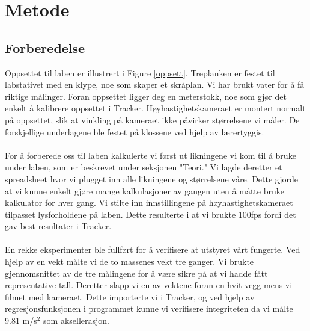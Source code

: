 \documentclass[10pt,a4paper]{report}
\begin{document}
\section*{Metode}
\subsection*{Forberedelse}
Oppsettet til laben er illustrert i Figure \ref{oppsett}. Treplanken er festet til labstativet med en klype, noe som skaper et skråplan. Vi har brukt vater for å få riktige målinger. Foran oppsettet ligger deg en meterstokk, noe som gjør det enkelt å kalibrere oppsettet i Tracker. Høyhastighetskameraet er montert normalt på oppsettet, slik at vinkling på kameraet ikke påvirker størrelsene vi måler. De forskjellige underlagene ble festet på klossene ved hjelp av lærertyggis.\\
\\For å forberede oss til laben kalkulerte vi først ut likningene vi kom til å bruke under laben, som er beskrevet under seksjonen "Teori." Vi lagde deretter et spreadsheet hvor vi plugget inn alle likningene og størrelsene våre. Dette gjorde at vi kunne enkelt gjøre mange kalkulasjoner av gangen uten å måtte bruke kalkulator for hver gang. Vi stilte inn innstillingene på høyhastighetskameraet tilpasset lysforholdene på laben. Dette resulterte i at vi brukte 100fps fordi det gav best resultater i Tracker.\\
\\En rekke eksperimenter ble fullført for å verifisere at utstyret vårt fungerte. Ved hjelp av en vekt målte vi de to massenes vekt tre ganger. Vi brukte gjennomsnittet av de tre målingene for å være sikre på at vi hadde fått representative tall. Deretter slapp vi en av vektene foran en hvit vegg mens vi filmet med kameraet. Dette importerte vi i Tracker, og ved hjelp av regresjonsfunksjonen i programmet kunne vi verifisere integriteten da vi målte 9.81 m/s$^2$ som aksellerasjon.
\end{document}
